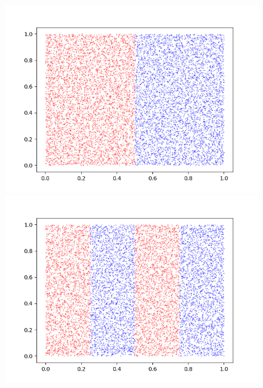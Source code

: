 \documentclass[12pt]{article}
\theoremstyle{plain}
\begin{document}
\begin{figure}[H]
\begin{minipage}[c][0.24\width]{
   0.24\textwidth}
   \centering
   \includegraphics[width=1\textwidth]{figure/section5/baker-0.png}
\end{minipage}
\begin{minipage}[c][0.24\width]{
   0.24\textwidth}
   \centering
   \includegraphics[width=1\textwidth]{figure/section5/baker-1-0*5-0*5.png}
\end{minipage}
\begin{minipage}[c][0.24\width]{
   0.24\textwidth}
   \centering

\end{minipage}
\end{figure}
\end{document}
